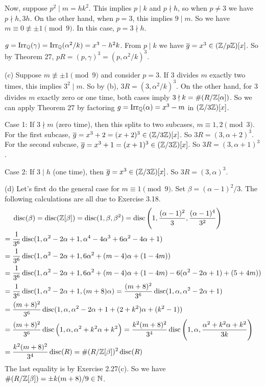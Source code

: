 \documentclass[../Marcus.tex]{subfiles}
\begin{document}
Now, suppose $p^2\mid m=hk^2$. This implies $p\mid k$ and $p\nmid h$, so when $p\neq 3$ we have $p\nmid h,3h$. On the other hand, when $p=3$, this implies $9\mid m$. So we have $m\equiv 0\not\equiv \pm 1\pmod{9}$. In this case, $p=3\nmid h$.

$g=\operatorname{Irr}_{\mathbb{Q}}(\gamma)=\operatorname{Irr}_{\mathbb{Q}}(\alpha^2/k)=x^3-h^2k$. From $p\mid k$ we have $\overline{g}=x^3\in(\mathbb{Z}/p\mathbb{Z})[x]$. So by Theorem 27, $pR=(p,\gamma)^3=(p,\alpha^2/k)^3$.

(c) Suppose $m\not\equiv \pm1\pmod{9}$ and consider $p=3$. If $3$ divides $m$ exactly two times, this implies $3^2\mid m$. So by (b), $3R=(3,\alpha^2/k)^3$. On the other hand, for $3$ divides $m$ exactly zero or one time, both cases imply $3\nmid k=\#(R/\mathbb{Z}[\alpha])$. So we can apply Theorem 27 by factoring $g=\operatorname{Irr}_{\mathbb{Q}}(\alpha)=x^3-m$ in $(\mathbb{Z}/3\mathbb{Z})[x]$.

Case 1: If $3\nmid m$ (zero time), then this splits to two subcases, $m\equiv 1,2\pmod{3}$. For the first subcase, $\overline{g}=x^3+2=(x+2)^3\in(\mathbb{Z}/3\mathbb{Z})[x]$. So $3R=(3,\alpha+2)^3$. For the second subcase, $\overline{g}=x^3+1=(x+1)^3\in(\mathbb{Z}/3\mathbb{Z})[x]$. So $3R=(3,\alpha+1)^3$.

Case 2: If $3\mid h$ (one time), then $\overline{g}=x^3\in(\mathbb{Z}/3\mathbb{Z})[x]$. So $3R=(3,\alpha)^3$.

(d) Let's first do the general case for $m\equiv 1 \pmod{9}$. Set $\beta=(\alpha-1)^2/3$. The following calculations are all due to Exercise 3.18.
\begin{align*}
    &\operatorname{disc}(\beta) = \operatorname{disc}(\mathbb{Z}[\beta]) = \operatorname{disc}(1,\beta,\beta^2) = \operatorname{disc}\left(1,\frac{(\alpha-1)^2}{3},\frac{(\alpha-1)^4}{3^2}\right) \\ ={} &\frac{1}{3^6}\operatorname{disc}(1,\alpha^2-2\alpha+1,\alpha^4-4\alpha^3+6\alpha^2-4\alpha+1) \\ ={} &\frac{1}{3^6}\operatorname{disc}(1,\alpha^2-2\alpha+1,6\alpha^2+(m-4)\alpha+(1-4m)) \\ ={} &\frac{1}{3^6}\operatorname{disc}(1,\alpha^2-2\alpha+1,6\alpha^2+(m-4)\alpha+(1-4m)-6(\alpha^2-2\alpha+1)+(5+4m)) \\ ={} &\frac{1}{3^6}\operatorname{disc}(1,\alpha^2-2\alpha+1,(m+8)\alpha) = \frac{(m+8)^2}{3^6}\operatorname{disc}(1,\alpha,\alpha^2-2\alpha+1) \\ ={} &\frac{(m+8)^2}{3^6}\operatorname{disc}(1,\alpha,\alpha^2-2\alpha+1+(2+k^2)\alpha+(k^2-1)) \\ ={} &\frac{(m+8)^2}{3^6}\operatorname{disc}\left(1,\alpha,\alpha^2+k^2\alpha+k^2\right) = \frac{k^2(m+8)^2}{3^4}\operatorname{disc}\left(1,\alpha,\frac{\alpha^2+k^2\alpha+k^2}{3k}\right) \\ ={} &\frac{k^2(m+8)^2}{3^4}\operatorname{disc}(R) = \#(R/\mathbb{Z}[\beta])^2\operatorname{disc}(R)
\end{align*}
The last equality is by Exercise 2.27(c). So we have $\#(R/\mathbb{Z}[\beta])=\pm k(m+8)/9\in\mathbb{N}$.
\end{document}
